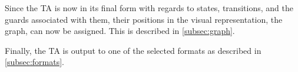 Since the TA is now in its final form with regards to states, transitions, and the guards associated with them, their positions in the visual representation, the graph, can now be assigned. This is described in \cref{subsec:graph}.

Finally, the TA is output to one of the selected formats as described in \cref{subsec:formats}.












